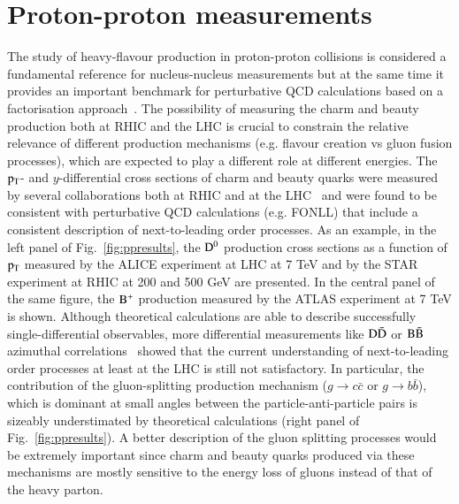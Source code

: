 \documentclass{webofc}
\begin{document}
\section{Proton-proton measurements}
\label{ppmeasurements}
The study of heavy-flavour production in proton-proton collisions is considered a fundamental reference for nucleus-nucleus measurements but at the same time it provides
an important benchmark for perturbative QCD calculations based on a factorisation approach~\cite{saporegravis}. The possibility of measuring the charm and beauty production both at RHIC and the LHC is crucial to constrain the relative relevance 
of different production mechanisms (e.g. flavour creation vs gluon fusion processes), which are expected to play a different role at different energies. The $\rm p_{\rm T} $- and $y$-differential cross sections of charm and beauty quarks were 
measured by several collaborations both at RHIC and at the LHC~\cite{pp1,pp2,pp3,pp4,pp5,pp6,pp7,pp8,pp9,pp10,pp11,pp12} and were found to be consistent with perturbative QCD calculations (e.g. FONLL\cite{FONLL}) that include a consistent description of next-to-leading order processes. 
As an example, in the left panel of Fig.~\ref{fig:ppresults}, the $\rm D^{0}$ production cross sections as a function of $\rm p_{\rm T} $ measured by the ALICE experiment at LHC at 7 TeV and by the STAR experiment at RHIC at 200 and 500 GeV are presented. 
In the central panel of the same figure, the $\rm B^{+}$ production measured by the ATLAS  experiment at 7 TeV is shown. Although theoretical calculations are able to describe successfully single-differential 
observables, more differential measurements like $\rm D \bar{D}$ or $\rm B \bar{B}$ azimuthal correlations~\cite{HFcorr1,HFcorr2} showed that the current understanding of next-to-leading order processes at least at the LHC is still not satisfactory. In particular, 
the contribution of the gluon-splitting production mechanism ($g \rightarrow c\bar{c}$ or $g \rightarrow b\bar{b}$), which is dominant at small angles between the particle-anti-particle pairs is 
sizeably understimated by theoretical calculations (right panel of Fig.~\ref{fig:ppresults}). A better description of the gluon splitting processes would be extremely important since charm 
and beauty quarks produced via these mechanisms are mostly sensitive to the energy loss of gluons instead of that of the heavy parton. 
\end{document}
